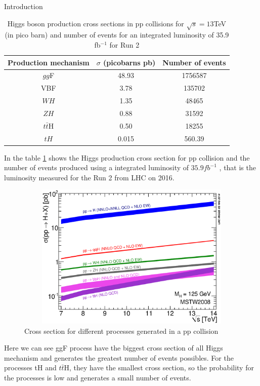 \begin{chapter}{Introduction}
\begin{table}[ht]
\centering
\caption[Higgs boson production cross sections  in pp collisions for $\sqrt{s}=13$TeV  (in pico barn) and number of events for an integrated luminosity of 35.9 fb$^{-1}$ for Run 2]{	Higgs boson production cross sections  in pp collisions for $\sqrt{s}=13$TeV  (in pico barn) and number of events for an integrated luminosity of 35.9 fb$^{-1}$ for Run 2 \protect \cite{pd}}
\begin{tabular}{|c|c|c|}
\hline
Production mechanism &
$\sigma$ (picobarns pb) & Number of events \\
\hline
$gg$F & 48.93 & 1756587\\
\hline
VBF & 3.78 & 135702\\
\hline
$WH$ & 1.35 & 48465\\
\hline
$ZH$ &0.88 & 31592\\
\hline
$t\bar{t}$H & 0.50 & 18255\\
\hline
$tH$	& 0.015 & 560.39\\
\hline
\end{tabular}
\label{crt}
\end{table}

In the table \ref{crt} shows the Higgs production cross section for pp collision and the number of events produced using a integrated luminosity of $35.9 fb^{-1}$ , that is the luminosity measured for the Run 2 from LHC on 2016\cite{pd}.

\begin{figure}
\centering
\includegraphics[width=12cm,height=7cm]{Chapter1/7-14xsec.eps}
\caption{
Cross section for different processes generated in a pp collision \protect \footnotemark }
 \label{csp}
\end{figure}

Here we can see ggF process have the biggest cross section of all Higgs mechanism and generates the greatest number of events possibles. For the processes tH and $t\bar{t}$H, they have the smallest cross section, so the probability for the processes is low and generates a small number of events. 
\pagebreak
{}

\end{chapter}
